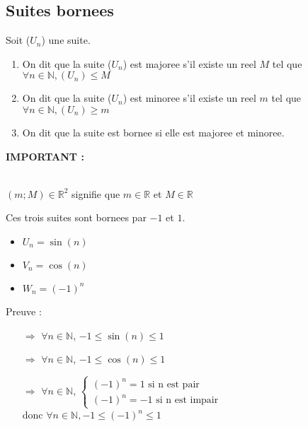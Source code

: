 \documentclass[a4paper,10pt]{book}
\begin{document}
	\subsection{Suites bornees}
	\begin{Def}
		Soit ($U_{n}$) une suite.\\
			\begin{enumerate}
  			\item On dit que la suite ($U_{n}$) est majoree s'il existe un reel $M$ tel que $\forall n \in \mathbb{N}, (U_{n}) \leq M$
  			\item On dit que la suite ($U_{n}$) est minoree s'il existe un reel $m$ tel que $\forall n \in \mathbb{N}, (U_{n}) \geq m$
  			\item On dit que la suite est bornee si elle est majoree et minoree.
			\end{enumerate}
	\end{Def}
	\smallskip
	\textbf{IMPORTANT :}\\

	\medskip\\

	\begin{rem}
		$(m;M) \in \mathbb{R}^2$ signifie que $m \in \mathbb{R}$ et $M \in \mathbb{R}$\\
	\end{rem}

	\exemple
	Ces trois suites sont bornees par $-1$ et $1$.
		\begin{itemize}
  	\item $U_{n} = \sin(n)$
  	\item $V_{n} = \cos(n)$
  	\item $W_{n} = (-1)^n$
		\end{itemize}
			Preuve :\\
		\begin{enumerate}
		\item [$\Rightarrow$] $\forall n \in \mathbb{N}$, $-1 \leq \sin(n) \leq 1$
		\item [$\Rightarrow$] $\forall n \in \mathbb{N}$, $-1 \leq \cos(n) \leq 1$
		\item [$\Rightarrow$] $\forall n \in \mathbb{N}$, $\begin{cases}(-1)^n = 1 \text{ si n est pair}\\(-1)^n = -1 \text{ si n est impair}\end{cases}$\\donc $\forall n \in \mathbb{N}, -1 \leq (-1)^n \leq 1$\\
		\end{enumerate}
\end{document}
